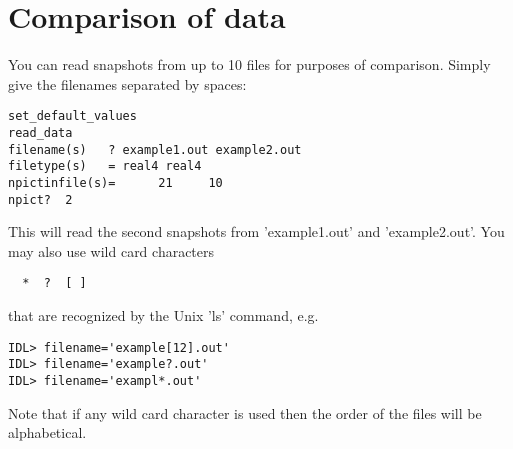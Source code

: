 \documentclass{article}
\begin{document}
\section{Comparison of data \label{s-compare}}

You can read snapshots from up to 10 files for purposes of
comparison. Simply give the filenames separated by spaces:
\begin{verbatim}
set_default_values
read_data
filename(s)   ? example1.out example2.out
filetype(s)   = real4 real4
npictinfile(s)=      21     10
npict?  2
\end{verbatim}
This will read the second snapshots from 'example1.out' and
'example2.out'. You may also use wild card characters 
\begin{verbatim}
  *  ?  [ ]
\end{verbatim}
that are recognized by the Unix 'ls' command, e.g.
\begin{verbatim}
IDL> filename='example[12].out'
IDL> filename='example?.out'
IDL> filename='exampl*.out'
\end{verbatim}
Note that if any wild card character is used then the order of the files will 
be alphabetical.
\end{document}
